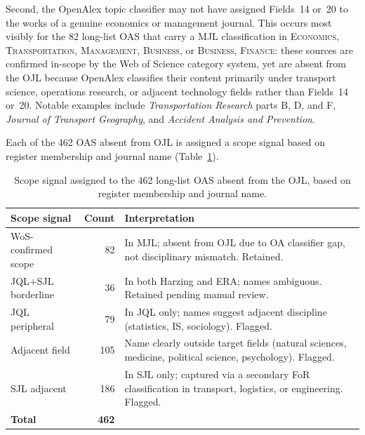 Second, the OpenAlex topic classifier may not have assigned Fields~14 or~20 to the
works of a genuine economics or management journal.
This occurs most visibly for the 82 long-list OAS that carry a MJL classification
in \textsc{Economics}, \textsc{Transportation}, \textsc{Management},
\textsc{Business}, or \textsc{Business, Finance}: these sources are confirmed
in-scope by the Web of Science category system, yet are absent from the OJL
because OpenAlex classifies their content primarily under transport science,
operations research, or adjacent technology fields rather than Fields~14 or~20.
Notable examples include \textit{Transportation Research} parts B, D, and F,
\textit{Journal of Transport Geography}, and
\textit{Accident Analysis and Prevention}.

Each of the 462 OAS absent from OJL is assigned a scope signal
based on register membership and journal name (Table~\ref{tab:scope_signals}).

\begin{table}[ht]
\centering
\caption{Scope signal assigned to the 462 long-list OAS absent from the OJL,
         based on register membership and journal name.}
\label{tab:scope_signals}
\small
\begin{tabular}{lrp{7cm}}
\toprule
\textbf{Scope signal} & \textbf{Count} & \textbf{Interpretation} \\
\midrule
WoS-confirmed scope  &  82 & In MJL; absent from OJL due to OA classifier gap,
                              not disciplinary mismatch. Retained. \\
JQL$+$SJL borderline &  36 & In both Harzing and ERA; names ambiguous.
                              Retained pending manual review. \\
JQL peripheral       &  79 & In JQL only; names suggest adjacent discipline
                              (statistics, IS, sociology). Flagged. \\
Adjacent field       & 105 & Name clearly outside target fields
                              (natural sciences, medicine, political science,
                              psychology). Flagged. \\
SJL adjacent         & 186 & In SJL only; captured via a secondary FoR
                              classification in transport, logistics,
                              or engineering. Flagged. \\
\midrule
\textbf{Total}       & \textbf{462} & \\
\bottomrule
\end{tabular}
\end{table}

